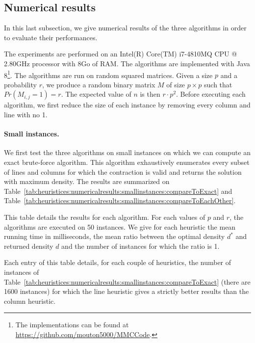 \subsection{Numerical results}

In this last subsection, we give numerical results of the three algorithms in order to evaluate their performances.

The experiments are performed on an Intel(R) Core(TM) i7-4810MQ CPU @ 2.80GHz processor with 8Go of RAM. The algorithms are implemented with Java 8\footnote{The implementations can be found at \url{https://github.com/mouton5000/MMCCode}.}. The algorithms are run on random squared matrices. Given a size $p$ and a probability $r$, we produce a random binary matrix $M$ of size $p \times p$ such that $Pr(M_{i,j} = 1) = r$. The expected value of $n$ is then $r \cdot p^2$. Before executing each algorithm, we first reduce the size of each instance by removing every column and line with no 1.

\paragraph{Small instances. }
We first test the three algorithms on small instances on which we can compute an exact brute-force algorithm. This algorithm exhaustively enumerates every subset of lines and columns for which the contraction is valid and returns the solution with maximum density. The results are summarized on Table~\ref{tab:heuristices:numericalresults:smallinstances:compareToExact} and  Table~\ref{tab:heuristices:numericalresults:smallinstances:compareToEachOther}.


\begin{table}[ht!]
	\centering
	\def\arraystretch{1.2}
	\setlength\tabcolsep{0.075cm}
	\scriptsize
	\caption{This table details the results for each algorithm. For each values of $p$ and $r$, the algorithms are executed on 50 instances. We give for each heuristic the mean running time in milliseconds, the mean ratio between the optimal density $d^*$ and returned density $d$ and the number of instances for which the ratio is 1.}
	
	\label{tab:heuristices:numericalresults:smallinstances:compareToExact}
\end{table}

\begin{table}[ht!]
	\centering
	\def\arraystretch{1.2}
	\setlength\tabcolsep{0.075cm}
	\scriptsize
	\caption{Each entry of this table details, for each couple of heuristics, the number of instances of Table~\ref{tab:heuristices:numericalresults:smallinstances:compareToExact} (there are 1600 instances) for which the line heuristic gives a strictly better results than the column heuristic. }
	
	\label{tab:heuristices:numericalresults:smallinstances:compareToEachOther}
\end{table}

